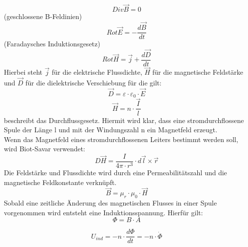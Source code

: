 \begin{equation}
Div \vec B = 0 
\end{equation}
(geschlossene B-Feldinien)
 \begin{equation}
 Rot \vec E = - \frac{d\vec B}{dt} 
 \end{equation}
 (Faradaysches Induktionsgesetz)
 \begin{equation}
 Rot \vec H = \vec j + \frac{d \vec D}{dt} 
 \end{equation}
Hierbei steht $\vec j$ für die elektrische Flussdichte, $\vec H$ für die magnetische Feldstärke und $\vec D$ für die dielektrische Verschiebung für die gilt:\\
\begin{equation}
\vec D = \varepsilon\cdot\varepsilon_0 \cdot\vec E 
\end{equation}
\begin{equation}
\vec H=n\cdot\frac{\vec I}{l}
\end{equation}
beschreibt das Durchflussgesetz. Hiermit wird klar, dass eine stromdurchflossene Spule der Länge l und mit der Windungszahl n ein Magnetfeld erzeugt.\\
Wenn das Magnetfeld eines stromdurchflossenen Leiters bestimmt werden soll, wird Biot-Savar verwendet:\\
\begin{equation}
D \vec H= \frac{I}{4 \pi \cdot r^3} \cdot d \vec l \times \vec r
\end{equation}
Die Feldstärke und Flussdichte wird durch eine Permeabilitätszahl und die magnetische Feldkonstante verknüpft. \\
\begin{equation}
\vec B = \mu_r \cdot \mu_0 \cdot \vec H
\end{equation}
Sobald eine zeitliche Änderung des magnetischen Flusses in einer Spule vorgenommen wird entsteht eine Induktionsspannung. Hierfür gilt:\\
\begin{equation}
\Phi=B \cdot A
\end{equation}

\begin{equation}
U_{ind}= -n\cdot \frac{d\Phi}{dt} = -n \cdot \dot{\Phi}
\end{equation}
\pagebreak